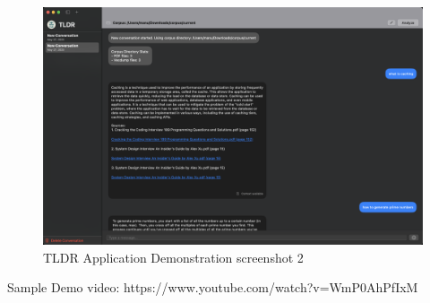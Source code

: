 \begin{figure}[h]
    \centering
    \includegraphics[width=1.0\linewidth]{images/result2.png}
    \caption{TLDR Application Demonstration screenshot 2}
    \label{fig:tldrAppDemoSc2}
\end{figure}

Sample Demo video: https://www.youtube.com/watch?v=WmP0AhPfIxM